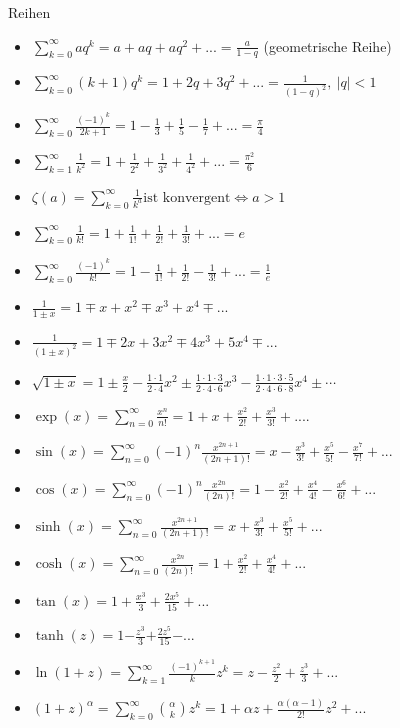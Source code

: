 \begin{Rechenregeln}{Reihen}{}
    \begin{itemize}
        \item $\sum_{k=0}^{\infty} aq^{k} = a + aq + aq^{2} +... = \frac{a}{1-q}$ (geometrische Reihe)
        \item $\sum_{k=0}^{\infty} (k+1)q^{k} = 1 + 2q + 3q^{2} +... = \frac{1}{(1-q)^{2}}, \ \vert q \vert < 1$ 
        \item $\sum_{k=0}^{\infty} \frac{(-1)^{k}}{2k+1} = 1 - \frac{1}{3} + \frac{1}{5} - \frac{1}{7} + ... = \frac{\pi}{4}$
        \item $\sum_{k=1}^{\infty} \frac{1}{k^{2}} = 1 + \frac{1}{2^{2}} + \frac{1}{3^{2}} + \frac{1}{4^{2}} + ... = \frac{\pi^{2}}{6}$
        \item $\zeta(a) = \sum_{k=0}^{\infty} \frac{1}{k^{a}} \text{ist konvergent} \iff a>1$
        \item $\sum_{k=0}^{\infty} \frac{1}{k!} = 1+\frac{1}{1!} + \frac{1}{2!} + \frac{1}{3!} + ... = e$
        \item $\sum_{k=0}^{\infty} \frac{(-1)^{k}}{k!} = 1 - \frac{1}{1!} + \frac{1}{2!} - \frac{1}{3!} + ... = \frac{1}{e}$
        \item $\frac{1}{1 \pm x} = 1 \mp x + x^2 \mp x^3 + x^4 \mp ...$
        \item $\frac{1}{(1 \pm x)^2} = 1 \mp 2x + 3x^2 \mp 4x^3 + 5x^4 \mp ...$
        \item $\sqrt{1 \pm x} = 1 \pm \frac{x}{2} - \frac{\scriptstyle{1\cdot 1}}{\scriptstyle{2 \cdot 4}}x^2 \pm \frac{\scriptstyle{1\cdot 1 \cdot 3}}{\scriptstyle{2 \cdot 4 \cdot 6}}x^3 - \frac{\scriptstyle{1 \cdot 1 \cdot 3 \cdot 5}}{\scriptstyle{2 \cdot 4 \cdot 6 \cdot 8}}x^4 \pm \scriptstyle\cdots$
        \item $\exp(x) = \sum_{n=0}^{\infty} \frac{x^{n}}{n!} = 1 + x + \frac{x^{2}}{2!} + \frac{x^{3}}{3!} + ....$
        \item $\sin(x) =  \sum_{n=0}^{\infty} (-1)^{n}\frac{x^{2n+1}}{(2n +1)!} = x - \frac{x^{3}}{3!} + \frac{x^{5}}{5!} - \frac{x^{7}}{7!} + ...$ 
        \item $\cos(x) =  \sum_{n=0}^{\infty} (-1)^{n}\frac{x^{2n}}{(2n)!} = 1 - \frac{x^{2}}{2!} + \frac{x^{4}}{4!} - \frac{x^{6}}{6!} + ...$ 
        \item $\sinh(x) = \sum_{n=0}^{\infty} \frac{x^{2n+1}}{(2n+1)!} = x + \frac{x^3}{3!} + \frac{x^5}{5!} + ...$
        \item $\cosh(x) = \sum_{n=0}^{\infty} \frac{x^{2n}}{(2n)!} = 1 + \frac{x^2}{2!} + \frac{x^4}{4!} + ...$
        \item $\tan(x) = 1 + \frac{x^3}{3} + \frac{2x^5}{15} + ...$
        \item $\tanh(z) = 1 \pmb{-} \frac{z^3}{3} \pmb{+} \frac{2z^5}{15} \pmb{-} ...$
        \item $\ln(1+z) = \sum_{k=1}^{\infty} \frac{(-1)^{k+1}}{k}z^k = z - \frac{z^2}{2} + \frac{z^3}{3} + ...$
        \item $(1+z)^\alpha = \sum_{k=0}^{\infty}  \binom{\alpha}{k} z^k = 1 + \alpha z + \frac{\alpha(\alpha - 1)}{2!} z ^ 2 + ...$
    \end{itemize}
\end{Rechenregeln}


